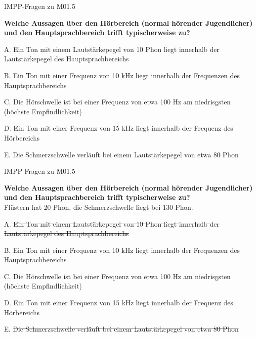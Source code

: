 \documentclass{beamer}
\begin{document}
\begin{frame}{IMPP-Fragen zu M01.5}
    
   \textbf{
Welche Aussagen über den Hörbereich (normal hörender Jugendlicher) und den Hauptsprachbereich trifft typischerweise zu?
   } \\[0.2 cm]

\begin{description}
\item{A.} Ein Ton mit einem Lautstärkepegel von 10 Phon liegt innerhalb der Lautstärkepegel des Hauptsprachbereichs
\item{B.}  Ein Ton mit einer Frequenz von 10 kHz liegt innerhalb der Frequenzen des Hauptsprachbereichs
\item{C.} Die Hörschwelle ist bei einer Frequenz von etwa 100 Hz am niedrisgsten (höchste Empfindlichkeit)
\item{D.} Ein Ton mit einer Frequenz von 15 kHz liegt innerhalb der Frequenz des Hörbereichs
\item{E.} Die Schmerzschwelle verläuft bei einem Lautstärkepegel von etwa 80 Phon
\end{description}  
    
\end{frame}


\begin{frame}{IMPP-Fragen zu M01.5}
    
  \textbf{
Welche Aussagen über den Hörbereich (normal hörender Jugendlicher) und den Hauptsprachbereich trifft typischerweise zu?
  } \\[0.2 cm]

Flüstern hat 20 Phon, die Schmerzschwelle liegt bei 130 Phon.  \\

\pause

\begin{description}
\item{A.} \sout{Ein Ton mit einem Lautstärkepegel von 10 Phon liegt innerhalb der Lautstärkepegel des Hauptsprachbereichs}
\item{B.}  Ein Ton mit einer Frequenz von 10 kHz liegt innerhalb der Frequenzen des Hauptsprachbereichs
\item{C.} Die Hörschwelle ist bei einer Frequenz von etwa 100 Hz am niedrisgsten (höchste Empfindlichkeit)
\item{D.} Ein Ton mit einer Frequenz von 15 kHz liegt innerhalb der Frequenz des Hörbereichs
\item{E.} \sout{Die Schmerzschwelle verläuft bei einem Lautstärkepegel von etwa 80 Phon}
\end{description}  



\end{frame}
\end{document}
